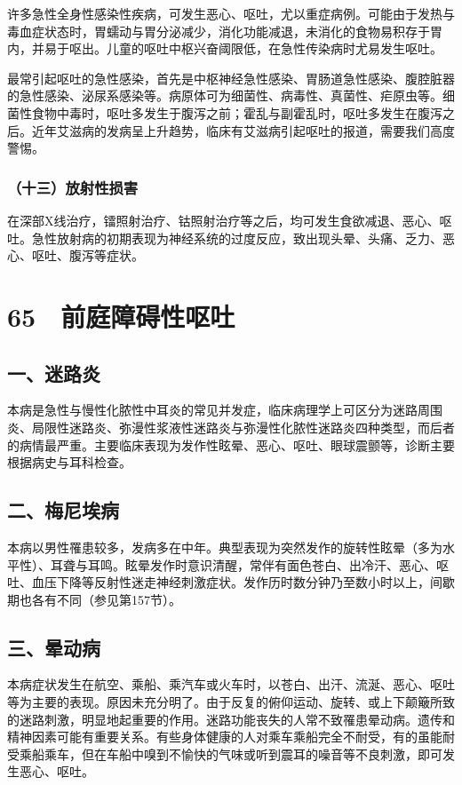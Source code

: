 许多急性全身性感染性疾病，可发生恶心、呕吐，尤以重症病例。可能由于发热与毒血症状态时，胃蠕动与胃分泌减少，消化功能减退，未消化的食物易积存于胃内，并易于呕出。儿童的呕吐中枢兴奋阈限低，在急性传染病时尤易发生呕吐。

最常引起呕吐的急性感染，首先是中枢神经急性感染、胃肠道急性感染、腹腔脏器的急性感染、泌尿系感染等。病原体可为细菌性、病毒性、真菌性、疟原虫等。细菌性食物中毒时，呕吐多发生于腹泻之前；霍乱与副霍乱时，呕吐多发生在腹泻之后。近年艾滋病的发病呈上升趋势，临床有艾滋病引起呕吐的报道，需要我们高度警惕。

\subsubsection{（十三）放射性损害}

在深部X线治疗，镭照射治疗、钴照射治疗等之后，均可发生食欲减退、恶心、呕吐。急性放射病的初期表现为神经系统的过度反应，致出现头晕、头痛、乏力、恶心、呕吐、腹泻等症状。

\protect\hypertarget{text00163.html}{}{}

\section{65　前庭障碍性呕吐}

\subsection{一、迷路炎}

本病是急性与慢性化脓性中耳炎的常见并发症，临床病理学上可区分为迷路周围炎、局限性迷路炎、弥漫性浆液性迷路炎与弥漫性化脓性迷路炎四种类型，而后者的病情最严重。主要临床表现为发作性眩晕、恶心、呕吐、眼球震颤等，诊断主要根据病史与耳科检查。

\subsection{二、梅尼埃病}

本病以男性罹患较多，发病多在中年。典型表现为突然发作的旋转性眩晕（多为水平性）、耳聋与耳鸣。眩晕发作时意识清醒，常伴有面色苍白、出冷汗、恶心、呕吐、血压下降等反射性迷走神经刺激症状。发作历时数分钟乃至数小时以上，间歇期也各有不同（参见第157节）。

\subsection{三、晕动病}

本病症状发生在航空、乘船、乘汽车或火车时，以苍白、出汗、流涎、恶心、呕吐等为主要的表现。原因未充分明了。由于反复的俯仰运动、旋转、或上下颠簸所致的迷路刺激，明显地起重要的作用。迷路功能丧失的人常不致罹患晕动病。遗传和精神因素可能有重要关系。有些身体健康的人对乘车乘船完全不耐受，有的虽能耐受乘船乘车，但在车船中嗅到不愉快的气味或听到震耳的噪音等不良刺激，即可发生恶心、呕吐。

